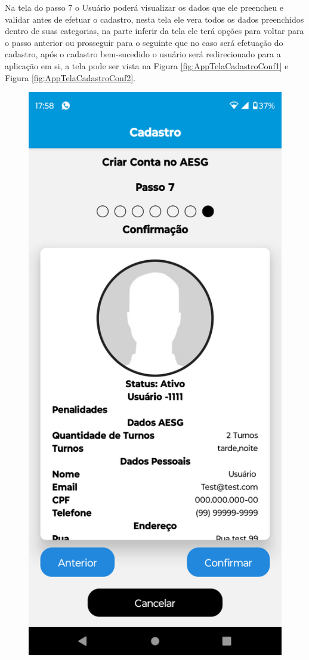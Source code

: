 \documentclass[
    12pt,                   %
    openright,              %
    oneside,                %
    a4paper,                %
    sumario=tradicional,    %
    english,                %
    brazil,                 %
    ]{abntex2}
\begin{document}
            \newpage
            Na tela do passo 7 o Usuário poderá visualizar os dados que ele preencheu e validar antes de efetuar o cadastro, nesta tela ele vera todos os dados preenchidos dentro de suas categorias, na parte inferir da tela ele terá opções para voltar para o passo anterior ou prosseguir para o seguinte que no caso será  efetuação do cadastro, após o cadastro bem-sucedido o usuário será redirecionado para a aplicação em si, a tela pode ser vista na Figura \ref{fig:AppTelaCadastroConf1} e Figura \ref{fig:AppTelaCadastroConf2}.
            \begin{figure}[!h]          
                \begin{minipage}{0.5\textwidth}
                    \centering
                    \includegraphics[width=0.8\linewidth]{Imagens/App Images User/AUCadastroConf1.png}

\end{minipage}
\end{figure}
\end{document}
